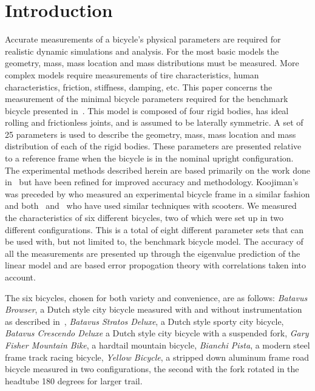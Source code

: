 \documentclass{bmd2010a}
\begin{document}
\section*{Introduction}
Accurate measurements of a bicycle's physical parameters are required for
realistic dynamic simulations and analysis. For the most basic models the
geometry, mass, mass location and mass distributions must be measured. More complex models
require measurements of tire characteristics, human characteristics, friction, stiffness, damping, etc. This
paper concerns the measurement of the minimal bicycle parameters required for
the benchmark bicycle presented in~\cite{Meijaard2007}. This
model is composed of four rigid bodies, has ideal rolling and frictionless joints,
and is assumed to be laterally symmetric. A set of 25
parameters is used to describe the geometry, mass, mass location and
mass distribution of each of the rigid bodies. These parameters are presented
relative to a reference frame when the bicycle is in the nominal upright
configuration. The experimental methods described herein are based primarily on the work
done in~\cite{Kooijman2006} but have been refined for improved accuracy and
methodology. Koojiman's was preceded by \cite{Roland1971} who measured an experimental bicycle frame in a
similar fashion and both~\cite{Dohring1953} and~\cite{Singh1971} who have used
similar techniques with scooters. We measured the characteristics of six
different bicycles, two of which were set up in two different configurations.
This is a total of eight different parameter sets that can be used with, but not
limited to, the benchmark bicycle model. The accuracy of all the measurements
are presented up through the eigenvalue prediction of the linear model and are
based error propogation theory with correlations taken into account.

The six bicycles, chosen for both variety and convenience, are as follows:
\emph{Batavus Browser}, a Dutch style city bicycle measured with and without
instrumentation as described in~\cite{Kooijman2009a}, \emph{Batavus Stratos
Deluxe}, a Dutch style sporty city bicycle, \emph{Batavus Crescendo Deluxe} a
Dutch style city bicycle with a suspended fork, \emph{Gary Fisher Mountain
Bike}, a hardtail mountain bicycle, \emph{Bianchi Pista}, a modern steel frame
track racing bicycle, \emph{Yellow Bicycle}, a stripped down aluminum frame
road bicycle measured in two configurations, the second with the fork rotated
in the headtube 180 degrees for larger trail.
\end{document}
